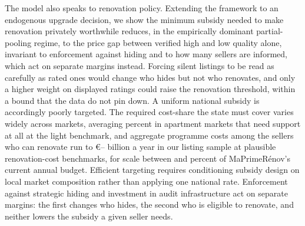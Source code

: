 The model also speaks to renovation policy. Extending the framework to an endogenous upgrade
decision, we show the minimum subsidy needed to make renovation privately worthwhile reduces, in
the empirically dominant partial-pooling regime, to the price gap between verified high and low
quality alone, invariant to enforcement against hiding and to how many sellers are informed,
which act on separate margins instead. Forcing silent listings to be read as carefully as rated ones would change who hides but not who renovates, and only a higher weight on displayed ratings could raise the renovation threshold, within a bound that the data do not pin down. %
A uniform national subsidy is accordingly poorly targeted. The
required cost-share the state must cover varies widely across
markets, averaging \attBaseCostShareTwoFiftyApt{} percent in apartment markets that need support at all at the light benchmark, and aggregate programme costs among the sellers who can renovate run to
\euro{}\attScCostBaseTotTwoFifty{}--\attScCostBaseTotFiveHundred{} billion a year in our listing sample at plausible renovation-cost benchmarks, for scale between \attScCostBaseTotTwoFiftyLo{} and
\attScCostBaseTotFiveHundredHi{} percent of MaPrimeR\'enov's current annual budget. Efficient targeting requires conditioning subsidy design
on local market composition rather than applying one national rate. Enforcement against strategic hiding and investment in audit
infrastructure act on separate margins: the first changes who hides, the second who is eligible to renovate, and neither lowers the subsidy a given seller needs.
